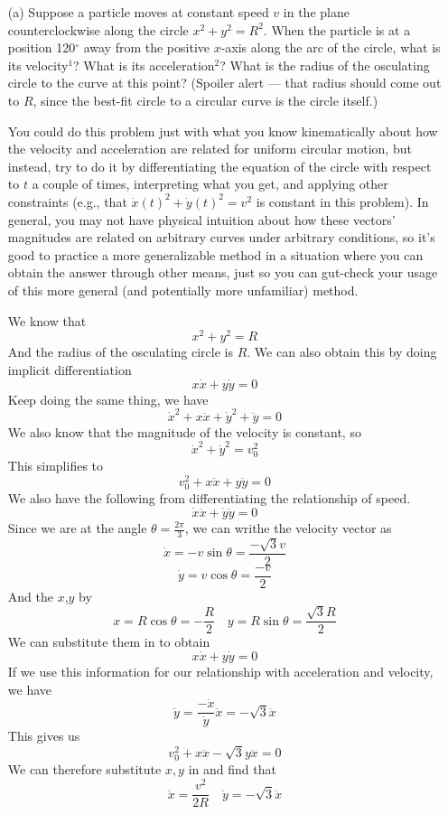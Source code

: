 \documentclass[12pt]{article}
\begin{document}
\begin{enumerate}
    \item[(a)] Suppose a particle moves at constant speed \( v \) in the plane counterclockwise along the circle \( x^2 + y^2 = R^2 \). When the particle is at a position 120\(^\circ\) away from the positive \(x\)-axis along the arc of the circle, what is its velocity\(^1\)? What is its acceleration\(^2\)? What is the radius of the osculating circle to the curve at this point? (Spoiler alert — that radius should come out to \( R \), since the best-fit circle to a circular curve is the circle itself.)

    You could do this problem just with what you know kinematically about how the velocity and acceleration are related for uniform circular motion, but instead, try to do it by differentiating the equation of the circle with respect to \( t \) a couple of times, interpreting what you get, and applying other constraints (e.g., that \( \dot{x}(t)^2 + \dot{y}(t)^2 = v^2 \) is constant in this problem). In general, you may not have physical intuition about how these vectors’ magnitudes are related on arbitrary curves under arbitrary conditions, so it’s good to practice a more generalizable method in a situation where you can obtain the answer through other means, just so you can gut-check your usage of this more general (and potentially more unfamiliar) method.

    We know that
    \[
    x^2 + y^2 = R
    \]
    And the radius of the osculating circle is $R$. We can also obtain this by doing implicit differentiation
    \[
    x\dot{x} + y\dot{y} = 0
    \]
    Keep doing the same thing, we have
    \[
    \dot{x}^2+x\ddot{x} + \dot{y}^2 + \ddot{y} = 0
    \]
    We also know that the magnitude of the velocity is constant, so
    \[
    \dot{x}^2+\dot{y}^2 = v_0^2
    \]
    This simplifies to 
    \[
    v_0^2 + x\ddot{x} + y\ddot{y} = 0
    \]
    We also have the following from differentiating the relationship of speed. 
    \[
    \dot{x}\ddot{x}+\dot{y}\ddot{y} = 0
    \]
    Since we are at the angle $\theta = \frac{2\pi}{3}$, we can writhe the velocity vector as
    \[
    \dot{x} = -v\sin\theta = \frac{-\sqrt{3}v}{2}
    \]
    \[
    \dot{y} = v\cos\theta = \frac{-v}{2}
    \]
    And the $x$,$y$ by
    \[
    x = R\cos\theta = -\frac{R}{2} \quad y = R\sin\theta = \frac{\sqrt{3}R}{2}
    \]
    We can substitute them in to obtain
    \[
    x\dot{x}+y\dot{y} = 0
    \]
    If we use this information for our relationship with acceleration and velocity, we have
    \[
    \ddot{y}=\frac{-\dot{x}}{\dot{y}}\ddot{x} = -\sqrt{3}\ddot{x}
    \]
    This gives us
    \[
    v_0^2 + x\ddot{x} - \sqrt{3}y\ddot{x}=0
    \]
    We can therefore substitute $x,y$ in and find that
    \[
    \ddot{x} = \frac{v^2}{2R} \quad \ddot{y} = -\sqrt{3}\ddot{x}
    \]    


\end{enumerate}
\end{document}
